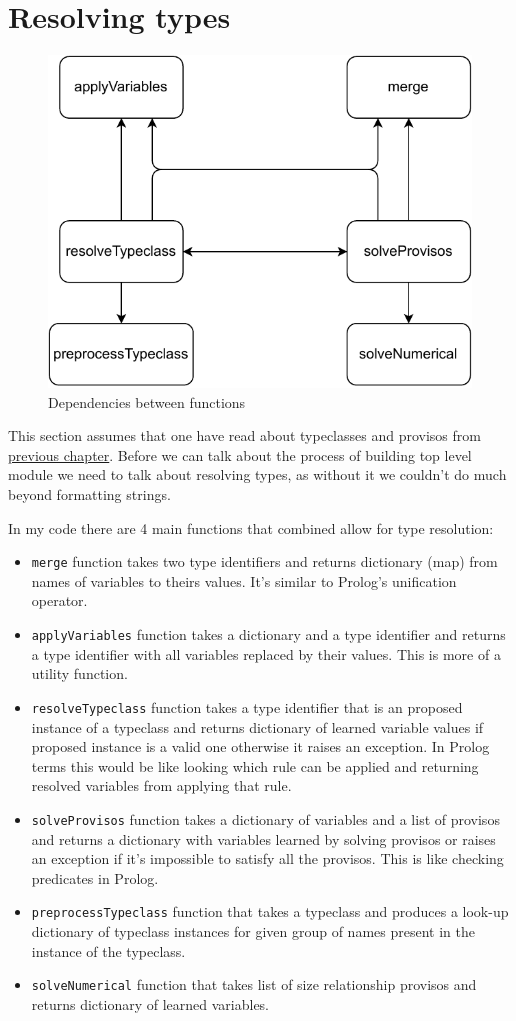 \documentclass[12pt]{report}
\begin{document}
\newpage
\section{Resolving types}
\begin{figure}[!h]
    \centering
    \caption{Dependencies between functions}

    \includegraphics[width=0.8\columnwidth]{pdfExports/LargeMapResolve.pdf}
\end{figure}
This section assumes that one have read about typeclasses and provisos from \hyperref[sec:Typeclasses]{previous chapter}.
Before we can talk about the process of building top level module we need to talk about resolving types, as without it we couldn't do much beyond formatting strings.
\par
In my code there are 4 main functions that combined allow for type resolution:
\begin{itemize}
    \item \verb!merge! function takes two type identifiers and returns dictionary (map) from names of variables to theirs values. It's similar to Prolog's unification operator.
    \item \verb!applyVariables! function takes a dictionary and a type identifier and returns a type identifier with all variables replaced by their values. This is more of a utility function.
    \item \verb!resolveTypeclass! function takes a type identifier that is an proposed instance of a typeclass and returns dictionary of learned variable values if proposed instance is a valid one otherwise it raises an exception. In Prolog terms this would be like looking which rule can be applied and returning resolved variables from applying that rule.
    \item \verb!solveProvisos! function takes a dictionary of variables and a list of provisos and returns a dictionary with variables learned by solving provisos or raises an exception if it's impossible to satisfy all the provisos. This is like checking predicates in Prolog.
    \item \verb!preprocessTypeclass! function that takes a typeclass and produces a look-up dictionary of typeclass instances for given group of names present in the instance of the typeclass.
    \item \verb!solveNumerical! function that takes list of size relationship provisos and returns dictionary of learned variables.
\end{itemize}
\end{document}
